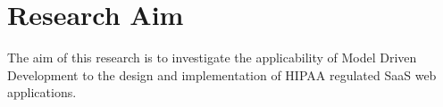\chapter{Research Aim}
The aim of this research is to investigate the applicability of Model Driven Development to the design and implementation of HIPAA regulated SaaS web applications.